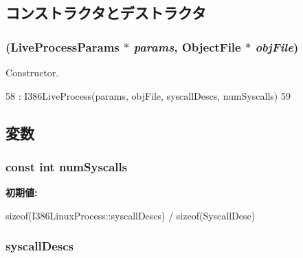\subsection{コンストラクタとデストラクタ}
\hypertarget{classX86ISA_1_1I386LinuxProcess_a338fe96c7b56e27c466b7c4dc5d7b012}{
\subsubsection[{I386LinuxProcess}]{ (LiveProcessParams $\ast$ {\em params}, \/  {\bf ObjectFile} $\ast$ {\em objFile})}}
\label{classX86ISA_1_1I386LinuxProcess_a338fe96c7b56e27c466b7c4dc5d7b012}


Constructor. 


\begin{DoxyCode}
58     : I386LiveProcess(params, objFile, syscallDescs, numSyscalls)
59 {}
\end{DoxyCode}


\subsection{変数}
\hypertarget{classX86ISA_1_1I386LinuxProcess_af2d1f57bee0c3a25f48faee7ab23c768}{
\subsubsection[{numSyscalls}]{\setlength{\rightskip}{0pt plus 5cm}const int {\bf numSyscalls}}}
\label{classX86ISA_1_1I386LinuxProcess_af2d1f57bee0c3a25f48faee7ab23c768}
{\bfseries 初期値:}
\begin{DoxyCode}
 
    sizeof(I386LinuxProcess::syscallDescs) / sizeof(SyscallDesc)
\end{DoxyCode}
\hypertarget{classX86ISA_1_1I386LinuxProcess_a08d67a94820b75842e07f030e548372e}{
\subsubsection[{syscallDescs}]{ {\bf syscallDescs}}}
\label{classX86ISA_1_1I386LinuxProcess_a08d67a94820b75842e07f030e548372e}


